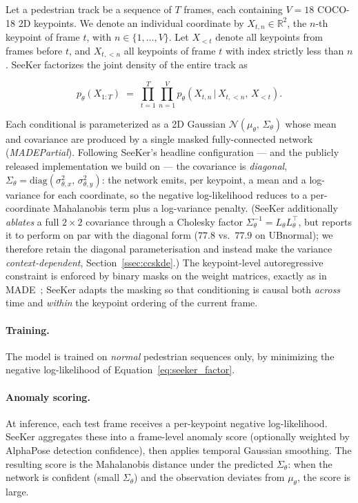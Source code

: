 \documentclass{article}
\begin{document}
Let a pedestrian track be a sequence of $T$ frames, each containing $V=18$
COCO-18 2D keypoints. We denote an individual coordinate by
$X_{t,n} \in \mathbb{R}^{2}$, the $n$-th keypoint of frame $t$, with
$n \in \{1,\dots,V\}$. Let $X_{<t}$ denote all keypoints from frames before
$t$, and $X_{t,<n}$ all keypoints of frame $t$ with index strictly less than
$n$. SeeKer factorizes the joint density of the entire track as

\begin{equation}
\label{eq:seeker_factor}
p_{\theta}\!\left(X_{1:T}\right) \;=\;
\prod_{t=1}^{T} \prod_{n=1}^{V}
p_{\theta}\!\left(X_{t,n}\,\big|\, X_{t,<n},\, X_{<t}\right).
\end{equation}

Each conditional is parameterized as a 2D Gaussian
$\mathcal{N}\!\left(\mu_{\theta},\, \Sigma_{\theta}\right)$ whose mean and
covariance are produced by a single masked fully-connected network
(\emph{MADEPartial}). Following SeeKer's headline configuration --- and the
publicly released implementation we build on --- the covariance is
\emph{diagonal}, $\Sigma_{\theta}=\mathrm{diag}(\sigma^2_{\theta,x},\,
\sigma^2_{\theta,y})$: the network emits, per keypoint, a mean and a
log-variance for each coordinate, so the negative log-likelihood reduces to a
per-coordinate Mahalanobis term plus a log-variance penalty. (SeeKer
additionally \emph{ablates} a full $2\times2$ covariance through a Cholesky
factor $\Sigma_{\theta}^{-1}=L_{\theta}L_{\theta}^{\!\top}$, but reports it to
perform on par with the diagonal form ($77.8$ vs.\ $77.9$ on UBnormal); we
therefore retain the diagonal parameterisation and instead make the variance
\emph{context-dependent}, Section~\ref{ssec:ccskde}.) The keypoint-level
autoregressive constraint is enforced by binary masks on the weight matrices,
exactly as in MADE~\citep{germain2015made}; SeeKer adapts the masking so that
conditioning is causal both \emph{across} time and \emph{within} the keypoint
ordering of the current frame.

\paragraph{Training.} The model is trained on \emph{normal} pedestrian
sequences only, by minimizing the negative log-likelihood of
Equation~\ref{eq:seeker_factor}.

\paragraph{Anomaly scoring.} At inference, each test frame receives a
per-keypoint negative log-likelihood. SeeKer aggregates these into a
frame-level anomaly score (optionally weighted by AlphaPose detection
confidence), then applies temporal Gaussian smoothing.
The resulting score is the Mahalanobis distance under the predicted
$\Sigma_{\theta}$: when the network is confident (small $\Sigma_{\theta}$)
and the observation deviates from $\mu_{\theta}$, the score is large.
\end{document}

